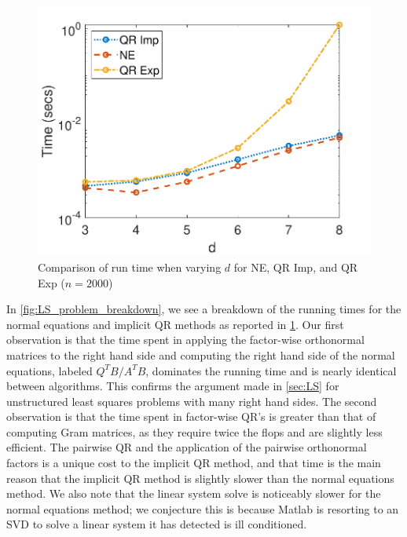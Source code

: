 \documentclass{article}
\begin{document}
\begin{figure}[ht!]
  \begin{center}
    \includegraphics[scale = 0.7]{lineplot_p.pdf}
    \caption[Figure]{Comparison of run time when varying $d$ for NE, QR Imp, and QR Exp ($n=2000$) \label{fig:LS_problem_line}}
  \end{center}
\end{figure}

In \cref{fig:LS_problem_breakdown}, we see a breakdown of the running times for the normal equations and implicit QR methods as reported in \cref{fig:LS_problem_line}.
Our first observation is that the time spent in applying the factor-wise orthonormal matrices to the right hand side and computing the right hand side of the normal equations, labeled $Q^TB/A^TB$, dominates the running time and is nearly identical between algorithms.
This confirms the argument made in \cref{sec:LS} for unstructured least squares problems with many right hand sides.
The second observation is that the time spent in factor-wise QR's is greater than that of computing Gram matrices, as they require twice the flops and are slightly less efficient.
The pairwise QR and the application of the pairwise orthonormal factors is a unique cost to the implicit QR method, and that time is the main reason that the implicit QR method is slightly slower than the normal equations method.
We also note that the linear system solve is noticeably slower for the normal equations method; we conjecture this is because Matlab is resorting to an SVD to solve a linear system it has detected is ill conditioned.
\end{document}
